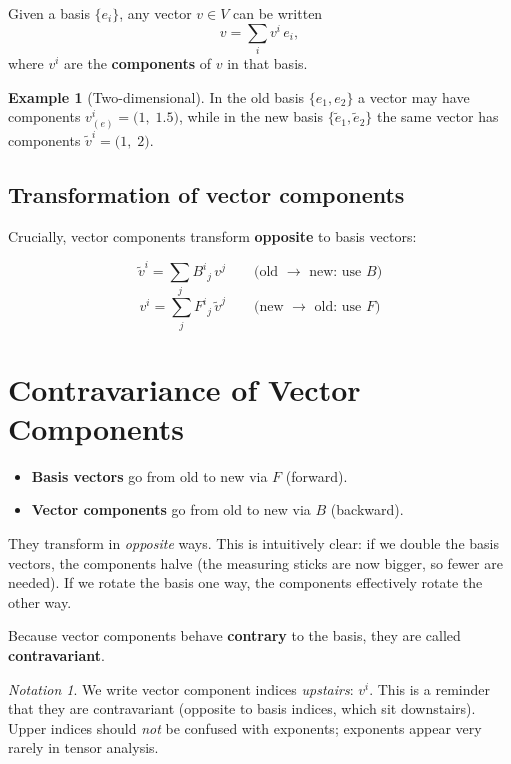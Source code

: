 \documentclass[12pt, a4paper]{report}
\theoremstyle{definition}
\newtheorem{example}{Example}[chapter]
\theoremstyle{plain}
\theoremstyle{remark}
\newtheorem{notation}{Notation}[chapter]
\newcommand{\tildee}[1]{\tilde{e}_{#1}}
\begin{document}
Given a basis $\{e_i\}$, any vector $v\in V$ can be written
\[
    v = \sum_{i} v^{i}\, e_i,
\]
where $v^{i}$ are the \textbf{components} of $v$ in that basis.

\begin{example}[Two-dimensional]
In the old basis $\{e_1, e_2\}$ a vector may have components
$v^{i}_{(e)} = \bigl(1,\;1.5\bigr)$, while in the new basis
$\{\tildee{1},\tildee{2}\}$ the same vector has components
$\tilde{v}^{i} = \bigl(1,\;2\bigr)$.
\end{example}

\subsection*{Transformation of vector components}

Crucially, vector components transform \textbf{opposite} to basis vectors:

\begin{equation}\label{eq:vec-comp-fwd}
    \boxed{\tilde{v}^{i} = \sum_{j} B^{i}{}_{j}\, v^{j}}
    \qquad\text{(old $\to$ new: use $B$)}
\end{equation}
\begin{equation}\label{eq:vec-comp-bwd}
    \boxed{v^{i} = \sum_{j} F^{i}{}_{j}\, \tilde{v}^{j}}
    \qquad\text{(new $\to$ old: use $F$)}
\end{equation}

\section{Contravariance of Vector Components}\label{sec:contravariance}

\begin{itemize}[nosep]
    \item \textbf{Basis vectors} go from old to new via $F$ (forward).
    \item \textbf{Vector components} go from old to new via $B$ (backward).
\end{itemize}
They transform in \emph{opposite} ways.  This is intuitively clear: if we double
the basis vectors, the components halve (the measuring sticks are now bigger, so
fewer are needed).  If we rotate the basis one way, the components effectively
rotate the other way.

Because vector components behave \textbf{contrary} to the basis, they are called
\textbf{contravariant}.

\begin{notation}
We write vector component indices \emph{upstairs}: $v^{i}$.  This is a reminder
that they are contravariant (opposite to basis indices, which sit downstairs).
Upper indices should \emph{not} be confused with exponents; exponents appear very
rarely in tensor analysis.
\end{notation}
\end{document}
